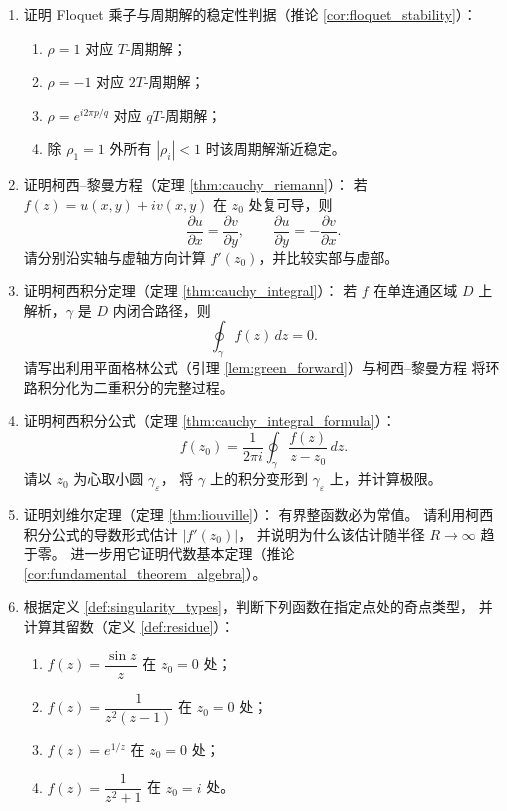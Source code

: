 \begin{enumerate}[leftmargin=3em, label=\textbf{题 \arabic*}]
    \item 证明 Floquet 乘子与周期解的稳定性判据（推论 \ref{cor:floquet_stability}）：
    \begin{enumerate}[label=(\roman*)]
        \item $\rho=1$ 对应 $T$-周期解；
        \item $\rho=-1$ 对应 $2T$-周期解；
        \item $\rho=e^{i2\pi p/q}$ 对应 $qT$-周期解；
        \item 除 $\rho_1=1$ 外所有 $|\rho_i|<1$ 时该周期解渐近稳定。
    \end{enumerate}

    \item 证明柯西--黎曼方程（定理 \ref{thm:cauchy_riemann}）：
    若 $f(z)=u(x,y)+iv(x,y)$ 在 $z_0$ 处复可导，则
    \[
    \frac{\partial u}{\partial x}=\frac{\partial v}{\partial y},\qquad
    \frac{\partial u}{\partial y}=-\frac{\partial v}{\partial x}.
    \]
    请分别沿实轴与虚轴方向计算 $f'(z_0)$，并比较实部与虚部。

    \item 证明柯西积分定理（定理 \ref{thm:cauchy_integral}）：
    若 $f$ 在单连通区域 $D$ 上解析，$\gamma$ 是 $D$ 内闭合路径，则
    \[
    \oint_\gamma f(z)\,dz=0.
    \]
    请写出利用平面格林公式（引理 \ref{lem:green_forward}）与柯西--黎曼方程
    将环路积分化为二重积分的完整过程。

    \item 证明柯西积分公式（定理 \ref{thm:cauchy_integral_formula}）：
    \[
    f(z_0)=\frac{1}{2\pi i}\oint_\gamma\frac{f(z)}{z-z_0}\,dz.
    \]
    请以 $z_0$ 为心取小圆 $\gamma_\varepsilon$，
    将 $\gamma$ 上的积分变形到 $\gamma_\varepsilon$ 上，并计算极限。

    \item 证明刘维尔定理（定理 \ref{thm:liouville}）：
    有界整函数必为常值。
    请利用柯西积分公式的导数形式估计 $|f'(z_0)|$，
    并说明为什么该估计随半径 $R\to\infty$ 趋于零。
    进一步用它证明代数基本定理（推论 \ref{cor:fundamental_theorem_algebra}）。

    \item 根据定义 \ref{def:singularity_types}，判断下列函数在指定点处的奇点类型，
    并计算其留数（定义 \ref{def:residue}）：
    \begin{enumerate}[label=(\roman*)]
        \item $f(z)=\dfrac{\sin z}{z}$ 在 $z_0=0$ 处；
        \item $f(z)=\dfrac{1}{z^2(z-1)}$ 在 $z_0=0$ 处；
        \item $f(z)=e^{1/z}$ 在 $z_0=0$ 处；
        \item $f(z)=\dfrac{1}{z^2+1}$ 在 $z_0=i$ 处。
    \end{enumerate}


\end{enumerate}
